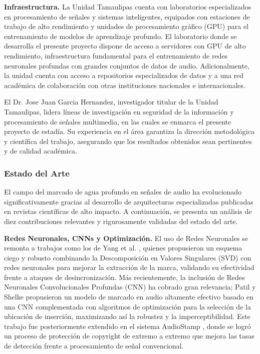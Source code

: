 \textbf{Infraestructura.} La Unidad Tamaulipas cuenta con laboratorios especializados en procesamiento de señales y sistemas inteligentes, equipados con estaciones de trabajo de alto rendimiento y unidades de procesamiento gráfico (GPU) para el entrenamiento de modelos de aprendizaje profundo. El laboratorio donde se desarrolla el presente proyecto dispone de acceso a servidores con GPU de alto rendimiento, infraestructura fundamental para el entrenamiento de redes neuronales profundas con grandes conjuntos de datos de audio. Adicionalmente, la unidad cuenta con acceso a repositorios especializados de datos y a una red académica de colaboración con otras instituciones nacionales e internacionales.

El Dr. Jose Juan Garcia Hernandez, investigador titular de la Unidad Tamaulipas, lidera líneas de investigación en seguridad de la información y procesamiento de señales multimedia, en las cuales se enmarca el presente proyecto de estadía. Su experiencia en el área garantiza la dirección metodológica y científica del trabajo, asegurando que los resultados obtenidos sean pertinentes y de calidad académica.

\subsubsection{Estado del Arte}
\label{subsec:estado_del_arte}

El campo del marcado de agua profundo en señales de audio ha evolucionado significativamente gracias al desarrollo de arquitecturas especializadas publicadas en revistas científicas de alto impacto. A continuación, se presenta un análisis de diez contribuciones relevantes y rigurosamente validadas del estado del arte.

\textbf{Redes Neuronales, CNNs y Optimización.} El uso de Redes Neuronales se remonta a trabajos como los de Yang et al. \cite{Yang_2014}, quienes propusieron un esquema ciego y robusto combinando la Descomposición en Valores Singulares (SVD) con redes neuronales para mejorar la extracción de la marca, validando su efectividad frente a ataques de desincronización. Más recientemente, la inclusión de Redes Neuronales Convolucionales Profundas (CNN) ha cobrado gran relevancia; Patil y Shelke \cite{Patil_2023} propusieron un modelo de marcado en audio altamente efectivo basado en una CNN complementada con algoritmos de optimización para la selección de la ubicación de inserción, maximizando así la robustez y la imperceptibilidad. Este trabajo fue posteriormente extendido en el sistema AudioStamp \cite{Patil_2024}, donde se logró un proceso de protección de copyright de extremo a extremo que mejora las tasas de detección frente a procesamiento de señal convencional.

